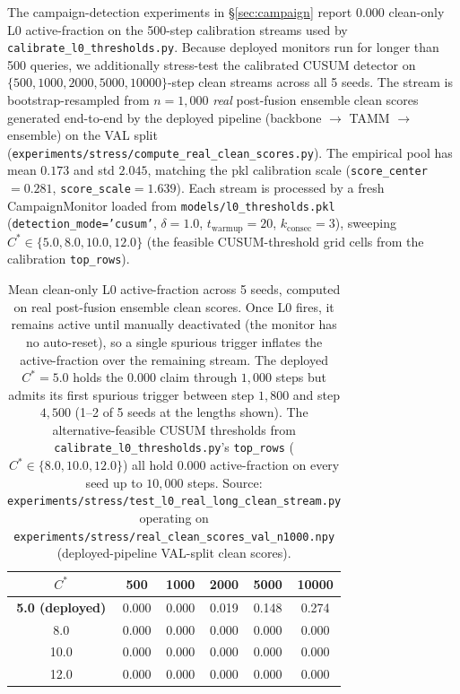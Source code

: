 The campaign-detection experiments in \S\ref{sec:campaign} report
$0.000$ clean-only L0 active-fraction on the 500-step calibration
streams used by \texttt{calibrate\_l0\_thresholds.py}. Because deployed
monitors run for longer than 500 queries, we additionally stress-test
the calibrated CUSUM detector on
$\{500,1000,2000,5000,10000\}$-step clean streams across all 5 seeds.
The stream is bootstrap-resampled from $n=1{,}000$ \emph{real}
post-fusion ensemble clean scores generated end-to-end by the deployed
pipeline (backbone $\to$ TAMM $\to$ ensemble) on the VAL split
(\texttt{experiments/stress/compute\_real\_clean\_scores.py}). The
empirical pool has mean $0.173$ and std $2.045$, matching the pkl
calibration scale (\texttt{score\_center}$=0.281$,
\texttt{score\_scale}$=1.639$). Each stream is processed by a fresh
CampaignMonitor loaded from \texttt{models/l0\_thresholds.pkl}
(\texttt{detection\_mode='cusum'}, $\delta=1.0$, $t_\text{warmup}=20$,
$k_\text{consec}=3$), sweeping $C^* \in \{5.0, 8.0, 10.0, 12.0\}$
(the feasible CUSUM-threshold grid cells from the calibration
\texttt{top\_rows}).

\begin{table}[h]
\centering
\small
\begin{tabular}{cccccc}
\toprule
$C^*$ & 500 & 1000 & 2000 & 5000 & 10000 \\
\midrule
\textbf{5.0 (deployed)} & 0.000 & 0.000 & 0.019 & 0.148 & 0.274 \\
8.0                     & 0.000 & 0.000 & 0.000 & 0.000 & 0.000 \\
10.0                    & 0.000 & 0.000 & 0.000 & 0.000 & 0.000 \\
12.0                    & 0.000 & 0.000 & 0.000 & 0.000 & 0.000 \\
\bottomrule
\end{tabular}
\caption{Mean clean-only L0 active-fraction across 5 seeds, computed
on real post-fusion ensemble clean scores. Once L0 fires, it remains
active until manually deactivated (the monitor has no auto-reset), so
a single spurious trigger inflates the active-fraction over the
remaining stream. The deployed $C^* = 5.0$ holds the
$0.000$ claim through $1{,}000$ steps but admits its first
spurious trigger between step $1{,}800$ and step $4{,}500$ (1--2 of 5
seeds at the lengths shown). The alternative-feasible CUSUM thresholds
from \texttt{calibrate\_l0\_thresholds.py}'s \texttt{top\_rows}
($C^* \in \{8.0,10.0,12.0\}$) all hold $0.000$ active-fraction on
every seed up to $10{,}000$ steps. Source:
\texttt{experiments/stress/test\_l0\_real\_long\_clean\_stream.py}
operating on
\texttt{experiments/stress/real\_clean\_scores\_val\_n1000.npy}
(deployed-pipeline VAL-split clean scores).}
\label{tab:l0_stress}
\end{table}

